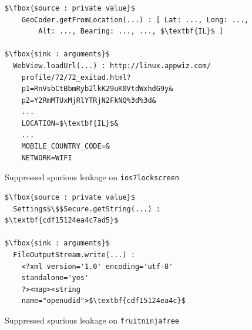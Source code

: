 \begin{figure}
\begin{minipage}[b]{0.95\columnwidth}
\begin{lstlisting}
$\fbox{source : private value}$
    GeoCoder.getFromLocation(...) : [ Lat: ..., Long: ..., 
	    Alt: ..., Bearing: ..., ..., $\textbf{IL}$ ] 
	    
$\fbox{sink : arguments}$
  WebView.loadUrl(...) : http://linux.appwiz.com/
    profile/72/72_exitad.html?
    p1=RnVsbCtBbmRyb2lkK29uK0VtdWxhdG9y&
    p2=Y2RmMTUxMjRlYTRjN2FkNQ%3d%3d&
    ...    
    LOCATION=$\textbf{IL}$&
    ...
    MOBILE_COUNTRY_CODE=&
    NETWORK=WIFI
\end{lstlisting}
\caption{\label{Fi:ios7}Suppressed spurious leakage on {\tt ios7lockscreen}}
\end{minipage}
\hfill
\begin{minipage}[b]{0.95\columnwidth}
\begin{lstlisting}
$\fbox{source : private value}$
  Settings$\$$Secure.getString(...) : $\textbf{cdf15124ea4c7ad5}$
  
$\fbox{sink : arguments}$
  FileOutputStream.write(...) : 
    <?xml version='1.0' encoding='utf-8' 
    standalone='yes' 
    ?><map><string 
    name="openudid">$\textbf{cdf15124ea4c}$
\end{lstlisting}
\caption{\label{Fi:fruitninja}Suppressed spurious leakage on {\tt fruitninjafree}}
\end{minipage}
\end{figure}


